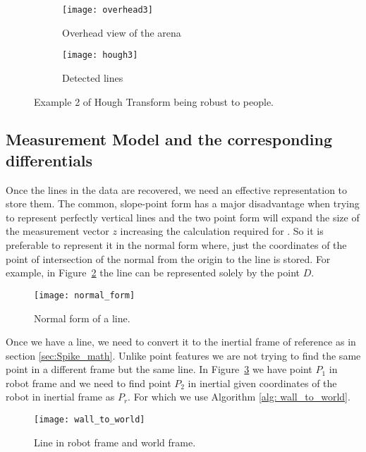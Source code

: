   \begin{figure}[h!]
      \centering
      \begin{subfigure}[b]{0.45\textwidth}
      
  	    \texttt{[image: overhead3]}
          \caption{Overhead view of the arena}
      \end{subfigure}
      \quad %
      \begin{subfigure}[b]{0.45\textwidth}
          \texttt{[image: hough3]}
 		 \caption{Detected lines}
      \end{subfigure}%
          \caption{Example 2 of Hough Transform being robust to people.}
          \label{fig: hough3}
  \end{figure}
 
\subsection{Measurement Model and the corresponding differentials}
\label{sec:linear_math}
Once the lines in the data are recovered, we need an effective representation to store them. The common, slope-point form has a major disadvantage when trying to represent perfectly vertical lines and the two point form will expand the size of the measurement vector $ z $ increasing the calculation required for \ekf. So it is preferable to represent it in the normal form where, just the coordinates of the point of intersection of the normal from the origin to the line is stored. For example, in Figure~\ref{fig: normal_form} the line can be represented solely by the point $ D $.

\begin{figure}
\centering
\texttt{[image: normal\_form]}
\caption{Normal form of a line.}
\label{fig: normal_form}
\end{figure}

Once we have a line, we need to convert it to the inertial frame of reference as in section \ref{sec:Spike_math}. Unlike point features we are not trying to find the same point in a different frame but the same line. In Figure~\ref{fig: wall_to_world} we have point $ P_1 $ in robot frame and we need to find point $ P_2 $ in inertial given coordinates of the robot in inertial frame as $ P_r $. For which we use Algorithm \ref{alg: wall_to_world}.
\begin{figure}
\centering
\texttt{[image: wall\_to\_world]}
\caption{Line in robot frame and world frame.}
\label{fig: wall_to_world}
\end{figure}

